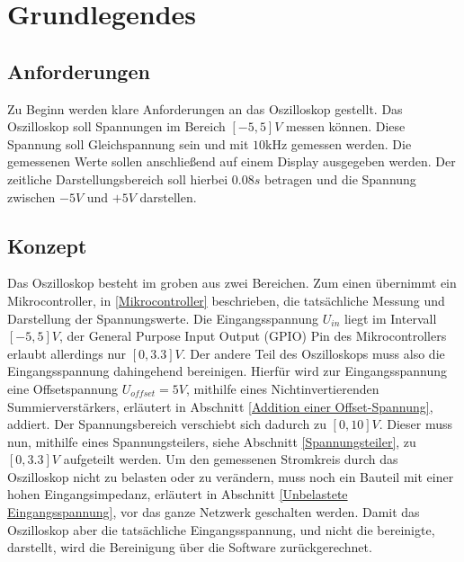\section{Grundlegendes}
\label{Grundlegendes}

\subsection{Anforderungen}
\label{Anforderungen}
Zu Beginn werden klare Anforderungen an das Oszilloskop gestellt. \newline
Das Oszilloskop soll Spannungen im Bereich $[-5, 5]V$ messen können.
Diese Spannung soll Gleichspannung sein und mit $10\si{\kilo\hertz}$ gemessen werden. \newline
Die gemessenen Werte sollen anschließend auf einem Display ausgegeben werden.
Der zeitliche Darstellungsbereich soll hierbei $0.08s$ betragen und die Spannung
zwischen $-5V$ und $+5V$ darstellen.



\subsection{Konzept}
Das Oszilloskop besteht im groben aus zwei Bereichen.
Zum einen übernimmt ein Mikrocontroller, in \autoref{Mikrocontroller} beschrieben,
die tatsächliche Messung und Darstellung der Spannungswerte.
Die Eingangsspannung $U_{in}$ liegt im Intervall $[-5, 5] V$,
der General Purpose Input Output (GPIO) Pin des Mikrocontrollers erlaubt allerdings nur $[0, 3.3] V$.
Der andere Teil des Oszilloskops muss also die Eingangsspannung dahingehend bereinigen.
\newline \newline
Hierfür wird zur Eingangsspannung eine Offsetspannung $U_{offset} = 5V$,
mithilfe eines Nichtinvertierenden Summierverstärkers,
erläutert in Abschnitt \ref{Addition einer Offset-Spannung}, addiert. \newline
Der Spannungsbereich verschiebt sich dadurch zu $[0, 10] V$.
Dieser muss nun, mithilfe eines Spannungsteilers, siehe Abschnitt \ref{Spannungsteiler},
zu $[0, 3.3] V$ aufgeteilt werden.
Um den gemessenen Stromkreis durch das Oszilloskop nicht zu belasten oder zu verändern,
muss noch ein Bauteil mit einer hohen Eingangsimpedanz, erläutert in Abschnitt \ref{Unbelastete Eingangsspannung},
vor das ganze Netzwerk geschalten werden.
Damit das Oszilloskop aber die tatsächliche Eingangsspannung, und nicht die bereinigte, darstellt,
wird die Bereinigung über die Software zurückgerechnet.


